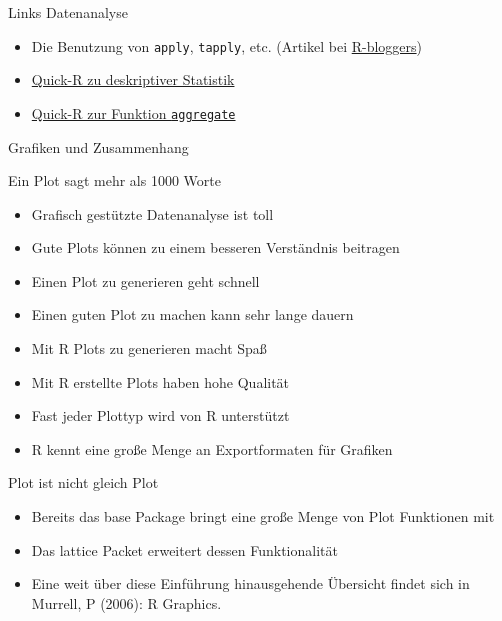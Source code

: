 \documentclass[ignorenonframetext,]{beamer}
\providecommand{\tightlist}{%
\setlength{\itemsep}{0pt}\setlength{\parskip}{0pt}}
\begin{document}
\begin{frame}[fragile]{Links Datenanalyse}

\begin{itemize}
\item
  Die Benutzung von \texttt{apply}, \texttt{tapply}, etc. (Artikel bei
  \href{http://www.r-bloggers.com/using-apply-sapply-lapply-in-r/}{R-bloggers})
\item
  \href{http://www.statmethods.net/stats/descriptives.html}{Quick-R zu
  deskriptiver Statistik}
\item
  \href{http://www.statmethods.net/management/aggregate.html}{Quick-R
  zur Funktion \texttt{aggregate}}
\end{itemize}

\end{frame}

\begin{frame}{Grafiken und Zusammenhang}

\end{frame}

\begin{frame}{Ein Plot sagt mehr als 1000 Worte}

\begin{itemize}
\tightlist
\item
  Grafisch gestützte Datenanalyse ist toll
\item
  Gute Plots können zu einem besseren Verständnis beitragen
\item
  Einen Plot zu generieren geht schnell
\item
  Einen guten Plot zu machen kann sehr lange dauern
\item
  Mit R Plots zu generieren macht Spaß
\item
  Mit R erstellte Plots haben hohe Qualität
\item
  Fast jeder Plottyp wird von R unterstützt
\item
  R kennt eine große Menge an Exportformaten für Grafiken
\end{itemize}

\end{frame}

\begin{frame}{Plot ist nicht gleich Plot}

\begin{itemize}
\tightlist
\item
  Bereits das base Package bringt eine große Menge von Plot Funktionen
  mit
\item
  Das lattice Packet erweitert dessen Funktionalität
\item
  Eine weit über diese Einführung hinausgehende Übersicht findet sich in
  Murrell, P (2006): R Graphics.
\end{itemize}

\end{frame}
\end{document}
